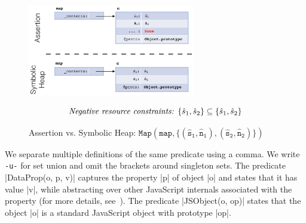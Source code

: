 \begin{figure}[t!]
\centering
\includegraphics[width=0.65\textwidth]{figures/symbvsass.png}

\vspace*{-0.7cm}
{\small $$
\text{\emph{Negative resource constraints: }} \{ \hat{s}_1, \hat{s}_2 \} \subseteq \{ \hat{s}_1, \hat{s}_2 \}
$$}
\vspace{-0.8cm}
\caption{Assertion vs. Symbolic Heap: {\small$\mathtt{Map(map, \{ (\hat{s}_1, \hat{n}_1), (\hat{s}_2, \hat{n}_2) \} )}$}}\label{fig:symb:state:versus:assertion}
\vspace{-0.5cm}
\end{figure}

 We separate multiple definitions of the same predicate using a comma. 
%
We write {\small\texttt{-u-}} for set union and omit the brackets around singleton sets. 
%
The predicate \jsinline|DataProp(o, p, v)| captures the property \jsinline|p| of object \jsinline|o| and states that it has value \jsinline|v|, while abstracting over other JavaScript internals associated with the property (for more details, see~\cite{javert}).
% 
The predicate \jsinline|JSObject(o, op)| states that the object \jsinline|o| is a standard JavaScript object with prototype \jsinline|op|.


